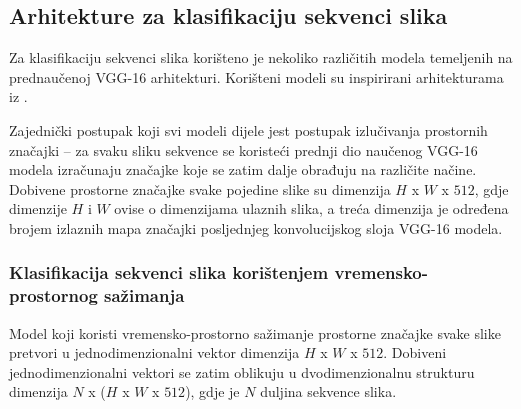 \documentclass[times, utf8, diplomski, numeric]{fer}
\begin{document}
\subsection{Arhitekture za klasifikaciju sekvenci slika}
Za klasifikaciju sekvenci slika korišteno je nekoliko različitih modela temeljenih na prednaučenoj VGG-16 arhitekturi. 
Korišteni modeli su inspirirani arhitekturama iz \citep{article:sequential_architectures}.

Zajednički postupak koji svi modeli dijele jest postupak izlučivanja prostornih značajki -- za svaku sliku sekvence se koristeći prednji dio naučenog VGG-16 modela izračunaju značajke koje se zatim dalje obrađuju na različite načine.
Dobivene prostorne značajke svake pojedine slike su dimenzija $H$ x $W$ x $512$, gdje dimenzije $H$ i $W$ ovise o dimenzijama ulaznih slika, a treća dimenzija je određena brojem izlaznih mapa značajki posljednjeg konvolucijskog sloja VGG-16 modela. 

\subsubsection{Klasifikacija sekvenci slika korištenjem vremensko-prostornog sažimanja}
Model koji koristi vremensko-prostorno sažimanje prostorne značajke svake slike pretvori u jednodimenzionalni vektor dimenzija $H$ x $W$ x $512$.
Dobiveni jednodimenzionalni vektori se zatim oblikuju u dvodimenzionalnu strukturu dimenzija $N$ x ($H$ x $W$ x $512$), gdje je $N$ duljina sekvence slika.
\end{document}
